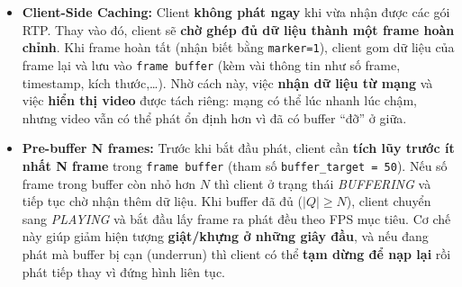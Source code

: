 \begin{itemize}
    \item \textbf{Client-Side Caching:} Client \textbf{không phát ngay} khi vừa nhận được các gói RTP. Thay vào đó, client sẽ \textbf{chờ ghép đủ dữ liệu thành một frame hoàn chỉnh}. Khi frame hoàn tất (nhận biết bằng \texttt{marker=1}), client gom dữ liệu của frame lại và lưu vào \texttt{frame buffer} (kèm vài thông tin như số frame, timestamp, kích thước,\ldots). 
    Nhờ cách này, việc \textbf{nhận dữ liệu từ mạng} và việc \textbf{hiển thị video} được tách riêng: mạng có thể lúc nhanh lúc chậm, nhưng video vẫn có thể phát ổn định hơn vì đã có buffer ``đỡ'' ở giữa.

    \item \textbf{Pre-buffer N frames:} Trước khi bắt đầu phát, client cần \textbf{tích lũy trước ít nhất N frame} trong \texttt{frame buffer} (tham số \texttt{buffer\_target = 50}). 
    Nếu số frame trong buffer còn nhỏ hơn $N$ thì client ở trạng thái \textit{BUFFERING} và tiếp tục chờ nhận thêm dữ liệu. Khi buffer đã đủ ($|Q|\ge N$), client chuyển sang \textit{PLAYING} và bắt đầu lấy frame ra phát đều theo FPS mục tiêu. 
    Cơ chế này giúp giảm hiện tượng \textbf{giật/khựng ở những giây đầu}, và nếu đang phát mà buffer bị cạn (underrun) thì client có thể \textbf{tạm dừng để nạp lại} rồi phát tiếp thay vì đứng hình liên tục.
\end{itemize}



\newpage
